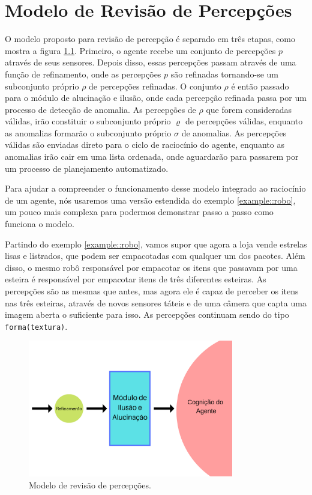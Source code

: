 \chapter{Modelo de Revisão de Percepções}

\noindent O modelo proposto para revisão de percepção é separado em três etapas, como mostra a figura \ref{fig:method}. Primeiro, o agente recebe um conjunto de percepções $p$ através de seus sensores. Depois disso, essas percepções passam através de uma função de refinamento, onde as percepções $p$ são refinadas tornando-se um subconjunto próprio $\rho$ de percepções refinadas. O conjunto $\rho$ é então passado para o módulo de alucinação e ilusão, onde cada percepção refinada passa por um processo de detecção de anomalia. As percepções de $\rho$ que forem consideradas válidas, irão constituir o subconjunto próprio $\varrho$ de percepções válidas, enquanto as anomalias formarão o subconjunto próprio $\sigma$ de anomalias. As percepções válidas são enviadas direto para o ciclo de raciocínio do agente, enquanto as anomalias irão cair em uma lista ordenada, onde aguardarão para passarem por um processo de planejamento automatizado.

Para ajudar a compreender o funcionamento desse modelo integrado ao raciocínio de um agente, nós usaremos uma versão estendida do exemplo \ref{example::robo}, um pouco mais complexa para podermos demonstrar passo a passo como funciona o modelo. 

\begin{example}
    Partindo do exemplo \ref{example::robo}, vamos supor que agora a loja vende estrelas lisas e listrados, que podem ser empacotadas com qualquer um dos pacotes. Além disso, o mesmo robô responsável por empacotar os itens que passavam por uma esteira é responsável por empacotar itens de três diferentes esteiras. As percepções são as mesmas que antes, mas agora ele é capaz de perceber os itens nas três esteiras, através de novos sensores táteis e de uma câmera que capta uma imagem aberta o suficiente para isso. As percepções continuam sendo do tipo \texttt{forma(textura)}.
    \label{example::robo2}
\end{example}{}

\begin{figure}[h!]
    \centering
    \includegraphics[width=0.8\textwidth]{Images/img2.png}
    \caption{Modelo de revisão de percepções.}
    \label{fig:method}
\end{figure}

